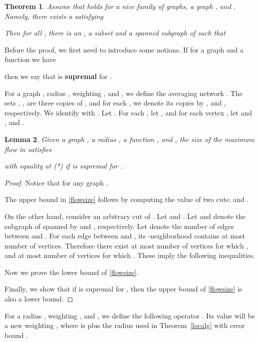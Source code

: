 \documentclass[12pt,a4paper]{article}
\newtheorem{Theorem}{Theorem}
\newtheorem{Lemma}[Theorem]{Lemma}
\renewcommand{\:}{\colon}
\begin{document}
\begin{Theorem} \label{separation2}
Assume that  holds for a nice family  of graphs, a graph , and . 
Namely, there exists a  satisfying

Then for all , there is an , a subset  and a spanned subgraph  of  such that 

\end{Theorem}

Before the proof, we first need to introduce some notions. 
If for a graph  and a function  we have 

then we say that  is \textbf{supremal} for .


For a graph , radius , weighting , and , we define the averaging network . The sets , ,  are three copies of , and for each , we denote its copies by ,  and , respectively. We identify  with . Let  . For each , let , and for each vertex , let  and , and .

\begin{Lemma} \label{aflowsize}
Given a graph , a radius , a function , and , the size of the maximum flow  in  satisfies

with equality at (*) if  is supremal for .
\end{Lemma}

\begin{proof}
Notice that for any graph ,


The upper bound in \eqref{flowsize} follows by computing the value of two cuts:  and . 

On the other hand, consider an arbitrary cut  of . 
Let  and . 
Let  and  denote the subgraph of  spanned by  and , respectively. 
Let  denote the number of edges between  and . 
For each edge between  and , its -neighborhood contains at most  number of vertices. 
Therefore there exist at most  number of vertices  for which , and at most  number of vertices  for which . 
These imply the following inequalities.


Now we prove the lower bound of \eqref{flowsize}.



Finally, we show that if  is supremal for , then the upper bound of \eqref{flowsize} is also a lower bound.




\end{proof}

For a radius , weighting ,  and , we define the following operator . Its value will be a new weighting , where  is  plus the radius used in Theorem~\ref{localg} with error bound .
\end{document}

